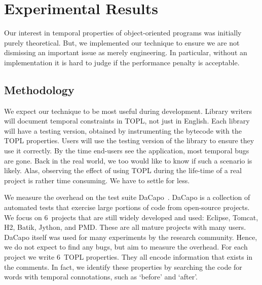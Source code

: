 \documentclass{sigplanconf}[10pt] %
\begin{document}
\section{Experimental Results} %


Our interest in temporal properties of object-oriented programs was initially purely theoretical.
But, we implemented our technique to ensure we are not dismissing an important issue as merely engineering.
In particular, without an implementation it is hard to judge if the performance penalty is acceptable.

\subsection{Methodology} %


We expect our technique to be most useful during development.
Library writers will document temporal constraints in TOPL, not just in English.
Each library will have a testing version, obtained by instrumenting the bytecode with the TOPL properties.
Users will use the testing version of the library to ensure they use it correctly.
By the time end-users see the application, most temporal bugs are gone.
Back in the real world, we too would like to know if such a scenario is likely.
Alas, observing the effect of using TOPL during the life-time of a real project is rather time consuming.
We have to settle for less.

We measure the overhead on the test suite DaCapo~\cite{dblp:conf/oopsla/dacapo}.
DaCapo is a collection of automated tests that exercise large portions of code from open-source projects.
We focus on $6$~projects that are still widely developed and used: Eclipse, Tomcat, H2, Batik, Jython, and PMD\null.
These are all mature projects with many users.
DaCapo itself was used for many experiments by the research community.
Hence, we do not expect to find any bugs, but aim to measure the overhead.
For each project we write $6$~TOPL properties.
They all encode information that exists in the comments.
In fact, we identify these properties by searching the code for words with temporal connotations, such as `before' and `after'.
\end{document}
